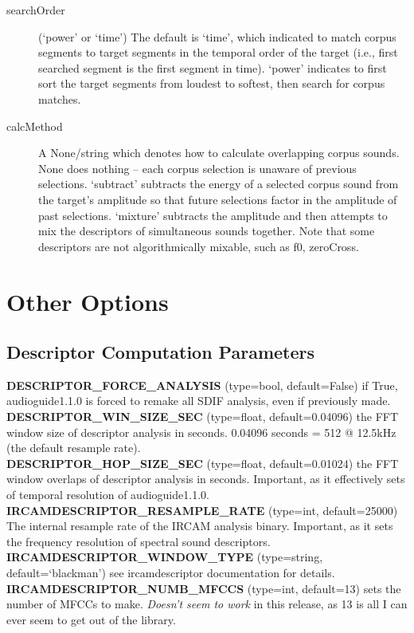 \documentclass{article}
\newcommand{\optEntry}[4]{\textbf{#1} (type={\color{red}#2}, default={\color{ForestGreen}#3}) #4\hspace{0.5em}\\}
\newcommand{\ag}{audioguide1.1.0\xspace}
\begin{document}
\begin{spacing}{1.2}
\begin{description}
\item[searchOrder] (`power' or `time')  The default is `time', which indicated to match corpus segments to target segments in the temporal order of the target (i.e., first searched segment is the first segment in time).  `power' indicates to first sort the target segments from loudest to softest, then search for corpus matches.

\item[calcMethod] A None/string which denotes how to calculate overlapping corpus sounds.  None does nothing -- each corpus selection is unaware of previous selections.  `subtract' subtracts the energy of a selected corpus sound from the target's amplitude so that future selections factor in the amplitude of past selections.  `mixture' subtracts the amplitude and then attempts to mix the descriptors of simultaneous sounds together.  Note that some descriptors are not algorithmically mixable, such as f0, zeroCross.
\end{description}




\section{Other Options}\label{otheroptions}
\subsection{Descriptor Computation Parameters}
\optEntry{DESCRIPTOR\_FORCE\_ANALYSIS}{bool}{False}{if True, \ag is forced to remake all SDIF analysis, even if previously made.}

\optEntry{DESCRIPTOR\_WIN\_SIZE\_SEC}{float}{0.04096}{the FFT window size of descriptor analysis in seconds.  0.04096 seconds = 512 @ 12.5kHz (the default resample rate).}

\optEntry{DESCRIPTOR\_HOP\_SIZE\_SEC}{float}{0.01024}{the FFT window overlaps of descriptor analysis in seconds.  Important, as it effectively sets of temporal resolution of \ag.}

\optEntry{IRCAMDESCRIPTOR\_RESAMPLE\_RATE}{int}{25000}{The internal resample rate of the IRCAM analysis binary.  Important, as it sets the frequency resolution of spectral sound descriptors.}

\optEntry{IRCAMDESCRIPTOR\_WINDOW\_TYPE}{string}{`blackman'}{see ircamdescriptor documentation for details.}

\optEntry{IRCAMDESCRIPTOR\_NUMB\_MFCCS}{int}{13}{sets the number of MFCCs to make.  \emph{Doesn't seem to work} in this release, as 13 is all I can ever seem to get out of the library.}


\end{spacing}
\end{document}
